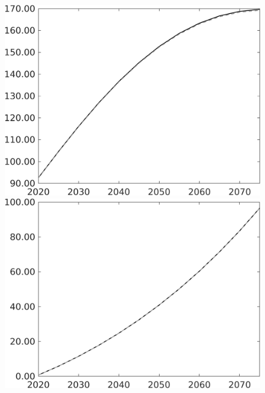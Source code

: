 \documentclass[12pt]{article}
\begin{document}
\begin{figure}[h!!]
\begin{minipage}[]{0.32\textwidth}
	\end{minipage}		
	\begin{minipage}[]{0.32\textwidth}
		\includegraphics[width=1\textwidth]{../../codding_model/own_basedOnFried/optimalPol_010922_revision/figures/all_13Sept22/PerdifNoTauf_Equlab_regime0_CompTaul_pee_spillover0_nsk0_xgr0_knspil1_sep1_LFlimit0_emsbase0_countec0_GovRev0_etaa0.79_lgd0.png}
	\end{minipage}	
	\begin{minipage}[]{0.32\textwidth}
		\includegraphics[width=1\textwidth]{../../codding_model/own_basedOnFried/optimalPol_010922_revision/figures/all_13Sept22/PerdifNoTauf_Equlab_regime0_CompTaul_pf_spillover0_nsk0_xgr0_knspil1_sep1_LFlimit0_emsbase0_countec0_GovRev0_etaa0.79_lgd0.png}

\end{minipage}
\end{figure}
\end{document}
